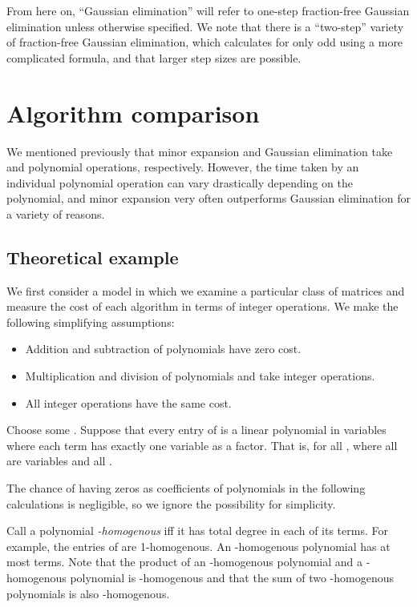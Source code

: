 \documentclass[12pt]{amsart}
\numberwithin{equation}{section}
\numberwithin{figure}{section}
\begin{document}
From here on, ``Gaussian elimination'' will refer to one-step fraction-free Gaussian elimination unless otherwise specified. We note that there is a ``two-step'' variety of fraction-free Gaussian elimination, which calculates  for only odd  using a more complicated formula, and that larger step sizes are possible.


\section{Algorithm comparison}\label{algCompare}
We mentioned previously that minor expansion and Gaussian elimination take  and  polynomial operations, respectively. However, the time taken by an individual polynomial operation can vary drastically depending on the polynomial, and minor expansion very often outperforms Gaussian elimination for a variety of reasons.

\subsection{Theoretical example}\label{theoreticalEx}
We first consider a model in which we examine a particular class of matrices and measure the cost of each algorithm in terms of integer operations. We make the following simplifying assumptions:
\begin{itemize}
\item Addition and subtraction of polynomials have zero cost.
\item Multiplication and division of polynomials  and  take  integer operations.
\item All integer operations have the same cost.
\end{itemize}

Choose some . Suppose that every entry of  is a linear polynomial in  variables where each term has exactly one variable as a factor. That is,  for all , where all  are variables and all .

The chance of having zeros as coefficients of polynomials in the following calculations is negligible, so we ignore the possibility for simplicity.

Call a polynomial \emph{-homogenous} iff it has total degree  in each of its terms. For example, the entries of  are 1-homogenous. An -homogenous polynomial has at most  terms. Note that the product of an -homogenous polynomial and a -homogenous polynomial is -homogenous and that the sum of two -homogenous polynomials is also -homogenous.
\end{document}
